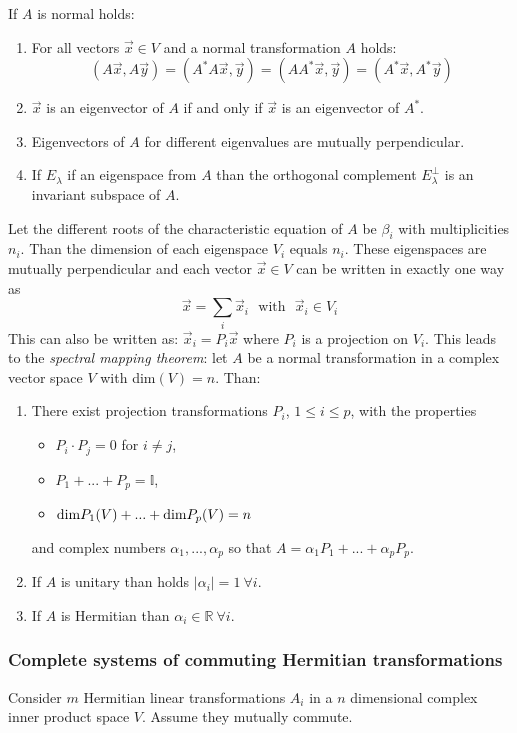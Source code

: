 If $A$ is normal holds:
\begin{enumerate}
	\item For all vectors $\vec{x}\in V$ and a normal transformation $A$ holds:
	\[
	(A\vec{x},A\vec{y})=(A^*A\vec{x},\vec{y})=(AA^*\vec{x},\vec{y})=(A^*\vec{x},A^*\vec{y})
	\]
	\item $\vec{x}$ is an eigenvector of $A$ if and only if $\vec{x}$ is an
	eigenvector of $A^*$.
	\item Eigenvectors of $A$ for different eigenvalues are mutually perpendicular.
	\item If $E_\lambda$ if an eigenspace from $A$ than the orthogonal complement
	$E_\lambda^\perp$ is an invariant subspace of $A$.
\end{enumerate}
Let the different roots of the characteristic equation of $A$ be $\beta_i$ with
multiplicities $n_i$. Than the dimension of each eigenspace $V_i$ equals
$n_i$. These eigenspaces are mutually perpendicular and each vector
$\vec{x}\in V$ can be written in exactly one way as
\[
\vec{x}=\sum_i\vec{x}_i~~~\mbox{with}~~~\vec{x}_i\in V_i
\]
This can also be written as: $\vec{x}_i=P_i\vec{x}$ where $P_i$ is a projection
on $V_i$. This leads to the {\it spectral mapping theorem}: let $A$ be a normal
transformation in a complex vector space $V$ with dim$(V)=n$. Than:
\begin{enumerate}
	\item There exist projection transformations $P_i$, $1\leq i\leq p$, with the
	properties
	\begin{itemize}
		\item $P_i\cdot P_j=0$ for $i\neq j$,
		\item $P_1+...+P_p= \mathbb{I}$,
		\item ${\rm dim}P_1(V)+...+{\rm dim}P_p(V)=n$
	\end{itemize}
	and complex numbers $\alpha_1,...,\alpha_p$ so that
	$A=\alpha_1P_1+...+\alpha_pP_p$.
	\item If $A$ is unitary than holds $|\alpha_i|=1~\forall i$.
	\item If $A$ is Hermitian than $\alpha_i\in \mathbb{R}~\forall i$.
\end{enumerate}

\subsubsection{Complete systems of commuting Hermitian transformations}
Consider $m$ Hermitian linear transformations $A_i$ in a $n$ dimensional
complex inner product space $V$. Assume they mutually commute.
 
